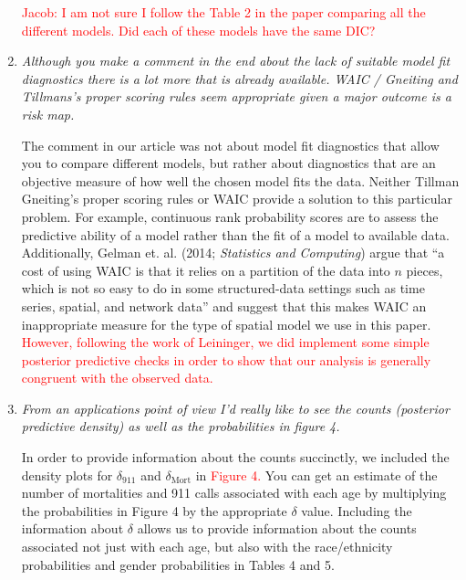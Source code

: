 \documentclass{article}
\begin{document}
\begin{enumerate}
\textcolor{red}{Jacob: I am not sure I follow the Table 2 in the paper comparing all the different models.  Did each of these models have the same DIC?}

\item\textit{Although you make a comment in the end about the lack of suitable model fit diagnostics there is a lot more that is already available.   WAIC / Gneiting and Tillmans's proper scoring rules seem appropriate given a major outcome is a risk map.}

The comment in our article was not about model fit diagnostics that allow you to compare different models, but rather about diagnostics that are an objective measure of how well the chosen model fits the data. Neither Tillman Gneiting's proper scoring rules or WAIC provide a solution to this particular problem. For example, continuous rank probability scores are to assess the predictive ability of a model rather than the fit of a model to available data. Additionally, Gelman et. al. (2014; \textit{Statistics and Computing}) argue that ``a cost of using WAIC is that it relies on a partition of the data into $n$ pieces, which is not so easy to do in some structured-data settings such as time series, spatial, and network data'' and suggest that this makes WAIC an inappropriate measure for the type of spatial model we use in this paper. \textcolor{red}{However, following the work of Leininger, we did implement some simple posterior predictive checks in order to show that our analysis is generally congruent with the observed data.}

\item\textit{From an applications point of view I'd really like to see the counts (posterior predictive density) as well as the probabilities in figure 4.}

In order to provide information about the counts succinctly, we included the density plots for $\delta_{911}$ and $\delta_{\text{Mort}}$ in \textcolor{red}{Figure 4.} You can get an estimate of the number of mortalities and 911 calls associated with each age by multiplying the probabilities in Figure 4 by the appropriate $\delta$ value. Including the information about $\delta$ allows us to provide information about the counts associated not just with each age, but also with the race/ethnicity probabilities and gender probabilities in Tables 4 and 5. 

\end{enumerate}
\end{document}
